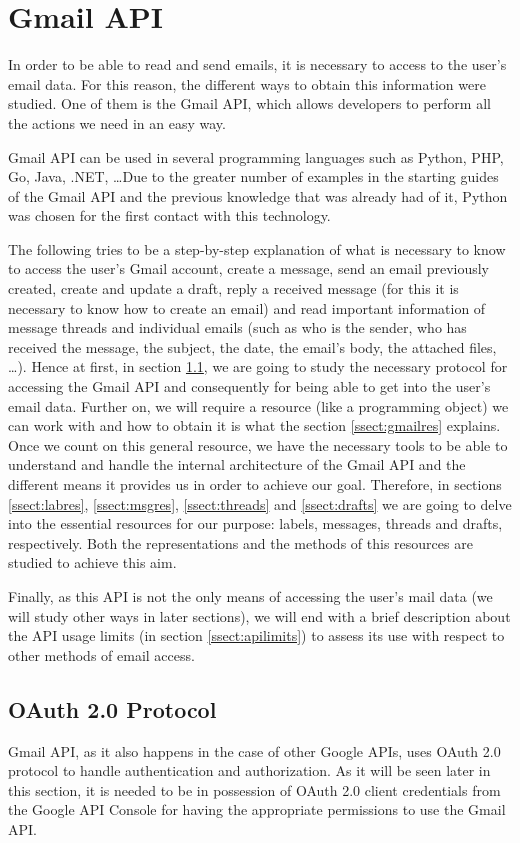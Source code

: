 \section{Gmail API}\label{sect:gmailapi}
In order to be able to read and send emails, it is necessary to access to the user's email data. For this reason, the different ways to obtain this information were studied. One of them is the Gmail API, which allows developers to perform all the actions we need in an easy way.

Gmail API can be used in several programming languages such as Python, PHP, Go, Java, .NET, \ldots Due to the greater number of examples in the starting guides of the Gmail API \citep{gmailAPI} and the previous knowledge that was already had of it, Python was chosen for the first contact with this technology.

The following tries to be a step-by-step explanation of what is necessary to know to access the user's Gmail account, create a message, send an email previously created, create and update a draft, reply a received message (for this it is necessary to know how to create an email) and read important information of message threads and individual emails (such as who is the sender, who has received the message, the subject, the date, the email's body, the attached files, \ldots). Hence at first, in section \ref{ssect:oauth}, we are going to study the necessary protocol for accessing the Gmail API and consequently for being able to get into the user's email data. Further on, we will require a resource (like a programming object) we can work with and how to obtain it is what the section \ref{ssect:gmailres} explains. Once we count on this general resource, we have the necessary tools to be able to understand and handle the internal architecture of the Gmail API and the different means it provides us in order to achieve our goal. Therefore, in sections \ref{ssect:labres}, \ref{ssect:msgres}, \ref{ssect:threads} and \ref{ssect:drafts} we are going to delve into the essential resources for our purpose: labels, messages, threads and drafts, respectively. Both the representations and the methods of this resources are studied to achieve this aim.

Finally, as this API is not the only means of accessing the user's mail data (we will study other ways in later sections), we will end with a brief description about the API usage limits (in section \ref{ssect:apilimits}) to assess its use with respect to other methods of email access.

\subsection{OAuth 2.0 Protocol}\label{ssect:oauth}
Gmail API, as it also happens in the case of other Google APIs, uses OAuth 2.0 protocol \citep{oauth} to handle authentication and authorization. As it will be seen later in this section, it is needed to be in possession of OAuth 2.0 client credentials from the Google API Console for having the appropriate permissions to use the Gmail API.


